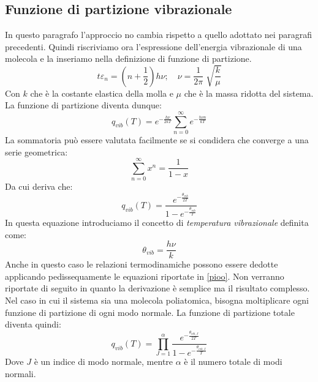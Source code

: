 \documentclass[oneside]{amsbook}
\numberwithin{section}{chapter}
\numberwithin{equation}{section}
\numberwithin{figure}{section}
\begin{document}
\subsection{Funzione di partizione vibrazionale}
In questo paragrafo l'approccio no cambia rispetto a quello adottato nei paragrafi precedenti. Quindi riscriviamo ora l'espressione dell'energia vibrazionale di una molecola e la inseriamo nella definizione di funzione di partizione.
\begin{equation}
t\varepsilon_n=\left(n+\frac{1}{2}\right) h\nu; \quad \nu =\frac{1}{2\pi}\sqrt[]{\frac{k}{\mu}}
\end{equation}
Con $k$ che è la costante elastica della molla e $\mu$ che è la massa ridotta del sistema. La funzione di partizione diventa dunque:
\begin{equation}
q_{vib}(T)=e^{-\frac{h\nu}{2kT}}\sum_{n=0}^\infty e^{-\frac{h\nu n}{kT}}
\end{equation}
La sommatoria può essere valutata facilmente se si condidera che converge a una serie geometrica:
\begin{equation}
\sum_{n=0}^\infty x^n=\frac{1}{1-x}
\end{equation}
Da cui deriva che:
\begin{equation}
q_{vib}(T)=\frac{e^{-\frac{\theta_{vib}}{2T}}}{1-e^{-\frac{\theta_{vib}}{T}}}
\end{equation}
In questa equazione introduciamo il concetto di \emph{temperatura vibrazionale} definita come:
\begin{equation}
\theta_{vib}=\frac{h\nu}{k}
\end{equation}
Anche in questo caso le relazioni termodinamiche possono essere dedotte applicando pedissequamente le equazioni riportate in \ref{pioo}. Non verranno riportate di seguito in quanto la derivazione è semplice ma il risultato complesso.
Nel caso in cui il sistema sia una molecola poliatomica, bisogna moltiplicare ogni funzione di partizione di ogni modo normale. La funzione di partizione totale diventa quindi:
\begin{equation}
q_{vib}(T)=\prod_{J=1}^\alpha\frac{e^{-\frac{\theta_{vib,J}}{2T}}}{1-e^{-\frac{\theta_{vib,J}}{T}}}
\end{equation}
Dove $J$ è un indice di modo normale, mentre $\alpha$ è il numero totale di modi normali.
\end{document}

